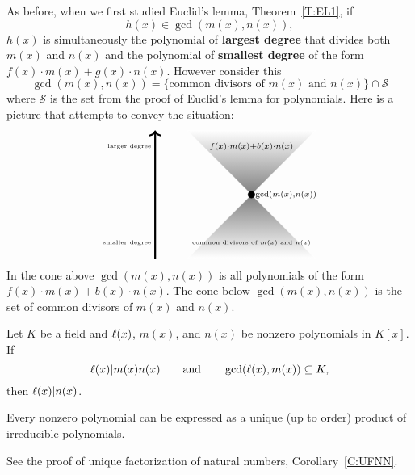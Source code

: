 \documentclass{ximera}
\begin{document}
As before, when we first studied Euclid's lemma, Theorem~\ref{T:EL1},
if
\[
h(x)\in\gcd(m(x),n(x)),
\]
$h(x)$ is simultaneously the polynomial of \textbf{largest degree}
that divides both $m(x)$ and $n(x)$ and the polynomial of
\textbf{smallest degree} of the form $f(x)\cdot m(x) + g(x)\cdot
n(x)$. However consider this
\[
\gcd(m(x),n(x)) = \{\text{common divisors of $m(x)$ and $n(x)$}\}\cap \mathcal{S}
\]
where $\mathcal{S}$ is the set from the proof of Euclid's lemma for
polynomials. Here is a picture that attempts to convey the situation:
\[
\begin{tikzpicture}
  \draw[white,thin,shading = axis, top color = white, bottom color = gray] (-2,2) -- (0,0)-- (2,2) -- (-2,2) -- cycle;
  \draw[white,thin,shading = axis, bottom color = white, top color = gray] (-2,-2) -- (0,0)-- (2,-2) -- (-2,-2) -- cycle;
  \filldraw (0,0) circle (3pt);
  \node[right] at (0,0) {$\scriptstyle\gcd(m(x),n(x))$};
  \node at (0,1.5) {$\scriptstyle f(x)\cdot m(x) + b(x)\cdot n(x)$};
  \node at (0,-1.5) {\text{\tiny common divisors of $m(x)$ and $n(x)$}};
  \draw[->,ultra thick] (-3,-2) -- (-3,2);
  \node[left] at (-3,-1.5) {\text{\tiny smaller degree}};
  \node[left] at (-3,1.5) {\text{\tiny larger degree}};
\end{tikzpicture}
\]
In the cone above $\gcd(m(x),n(x))$ is all polynomials of the form
$f(x)\cdot m(x) + b(x)\cdot n(x)$. The cone below $\gcd(m(x),n(x))$ is the
set of common divisors of $m(x)$ and $n(x)$.




\begin{corollary}\label{C:ELP2}
  Let $K$ be a field and $\ell(x)$, $m(x)$, and $n(x)$ be nonzero
  polynomials in $K[x]$. If
  \[
  \ell(x)|m(x)n(x)\qquad\text{and}\qquad \gcd(\ell(x),m(x))\subseteq K,
  \]
  then $\ell(x)|n(x)$.
\end{corollary}


\begin{corollary}\label{C:UFP}
  Every nonzero polynomial can be expressed as a unique (up to order)
  product of irreducible polynomials.
  \begin{sketch}
    See the proof of unique factorization of natural numbers,
    Corollary~\ref{C:UFNN}.
  \end{sketch}
\end{corollary}
\end{document}
